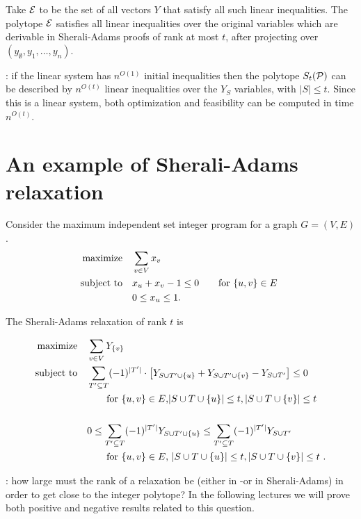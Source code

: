\documentclass[a4paper,twoside,justified]{tufte-handout}
\begin{document}
Take $ \mathcal{E} $ to be the set of all vectors $ Y $ that satisfy all
such linear inequalities. The polytope $ \mathcal{E} $ satisfies all
linear inequalities over the original variables which are derivable in
Sherali-Adams proofs of rank at most $ t $, after projecting over $
(y_{\emptyset},y_{1},\ldots,y_{n})$.


: if the linear system has $ n^{O(1)} $
initial inequalities then the polytope $ S_{t}(\mathcal{P}) $ can be
described by $ n^{O(t)} $ linear inequalities over the $ Y_{S} $
variables, with $ |S|\leq t $. Since this is a linear system, both
optimization and feasibility can be computed in time $ n^{O(t)} $.

\section{An example of Sherali-Adams relaxation}

Consider the maximum independent set integer program for a graph $
G=(V,E)$.
\begin{alignat}{2}
  \text{maximize}\hspace{1em}& \sum_{v\in V} x_{v}\notag \\
  \text{subject to}\hspace{1em}& x_{u} + x_{v} - 1\leq 0 \qquad \text{for $ \{u,v\}\in E $ }\\
  & 0 \leq x_{u}\leq 1.\notag
\end{alignat}

The Sherali-Adams relaxation of rank $t$ is

\begin{alignat*}{2}
  \text{maximize}\hspace{1em}& \sum_{v\in V} Y_{\{v\}}\notag \\
  \text{subject to}\hspace{1em}& \sum_{T'\subseteq T} (-1)^{|T'|} \cdot 
  \left[ 
    Y_{S\cup T'\cup \{u\} } + Y_{S\cup T'\cup \{v\} } - Y_{S\cup T'}
  \right]
  \leq 0 \\ 
  &\qquad \text{for $ \{u,v\}\in E $,$ |S\cup T\cup \{u\}| \leq
    t,|S\cup T\cup \{v\}|\leq t $}\\
  \\
  &0 \leq \sum_{T'\subseteq T} (-1)^{|T'|} Y_{S\cup T'\cup \{u\} } \leq
  \sum_{T'\subseteq T} (-1)^{|T'|} Y_{S\cup T' }\\
  &\qquad \text{for $ \{u,v\}\in E $, $|S\cup T\cup \{u\}| \leq
    t,|S\cup T\cup \{v\}|\leq t $  }.
\end{alignat*}

: how large must the
rank of a relaxation be (either in \Lovasz-\Schrijver or in
Sherali-Adams) in order to get close to the integer polytope? In the
following lectures we will prove both positive and negative results
related to this question.



\end{document}
